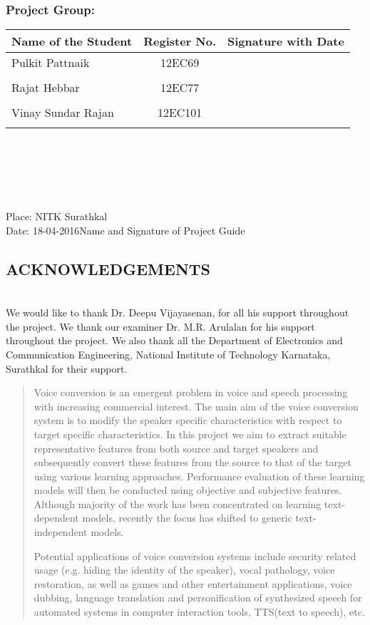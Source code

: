 \documentclass[BTech]{nitkdiss}
\begin{document}
\subsubsection*{Project Group:}
\begin{tabular}{lcl}
\hline
Name of the Student & Register No. & Signature with Date 			\\
\hline
Pulkit Pattnaik			&12EC69		&							\\\\
Rajat Hebbar			&12EC77		&							\\\\
Vinay Sundar Rajan			&12EC101		&							\\\\
\hline
\end{tabular} \\\\\\\\\\
Place: NITK Surathkal\\
Date: 18-04-2016\hfill Name and Signature of Project Guide

\pagebreak
\begin{center}
\section*{ACKNOWLEDGEMENTS}
\end{center}
\\
We would like to thank Dr. Deepu Vijayasenan, for all his support throughout the project. We thank our examiner Dr. M.R. Arulalan for his support throughout the project. We also thank all the Department of Electronics and Communication Engineering, National Institute of Technology Karnataka, Surathkal for their support.
\newpage

\begin{abstract}
Voice conversion is an emergent problem in voice and speech processing with increasing commercial interest. The main aim of the  voice conversion system is to modify the speaker specific characteristics with respect to target specific characteristics. In this project we aim to extract suitable representative features from both source and target speakers and subsequently convert these features from the source to that of the target using various learning approaches. Performance evaluation of these learning models will then be conducted using objective and subjective features. Although majority of the work has been concentrated on learning text-dependent models, recently the focus has shifted to generic text-independent models.

Potential applications of voice conversion systems include security related usage (e.g. hiding the identity of the speaker), vocal pathology, voice restoration, as well as games and other entertainment applications, voice dubbing, language translation and personification of synthesized speech for automated systems in computer interaction tools, TTS(text to speech), etc. 
\end{abstract}
\end{document}
